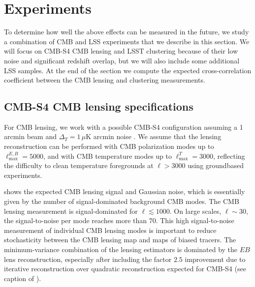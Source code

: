 \documentclass[prd,superscriptaddress,floatfix,notitlepage,nofootinbib,reprint]{revtex4-1} %
\begin{document}
\section{Experiments}
\label{se:Expts}

To determine how well the above effects can be measured in the future, we study a combination of CMB and LSS experiments that we describe in this section.
We will focus on CMB-S4 CMB lensing and LSST clustering because of their low noise and significant redshift overlap, but we will also include some additional LSS samples.
At the end of the section we compute the expected cross-correlation coefficient between the CMB lensing and clustering measurements.


\subsection{CMB-S4 CMB lensing specifications}

For CMB lensing, we work with a possible CMB-S4 configuration assuming a 1 arcmin beam and $\Delta_{T}=1\,\mu$K arcmin noise \cite{CMBS4SciBook}.
We assume that the lensing reconstruction can be performed with CMB polarization modes up to $\ell_\mathrm{max}^{E,B}=5000$, and with CMB temperature modes up to $\ell_\mathrm{max}^{T}=3000$, reflecting the difficulty to clean temperature foregrounds at $\ell>3000$ using groundbased experiments.

 shows the expected CMB lensing signal and Gaussian noise, which is essentially given by the number of signal-dominated background CMB modes.
The CMB lensing measurement is signal-dominated for $\ell\lesssim 1000$. 
On large scales, $\ell\sim 30$, the signal-to-noise per mode reaches more than 70.
This high signal-to-noise measurement of individual CMB lensing modes is important to reduce stochasticity between the CMB lensing map and maps of biased tracers.
The minimum-variance combination of the lensing estimators is dominated by the $EB$ lens reconstruction, especially after including the factor $2.5$ improvement due to iterative reconstruction over quadratic reconstruction expected for CMB-S4 (see caption of ).
\end{document}
